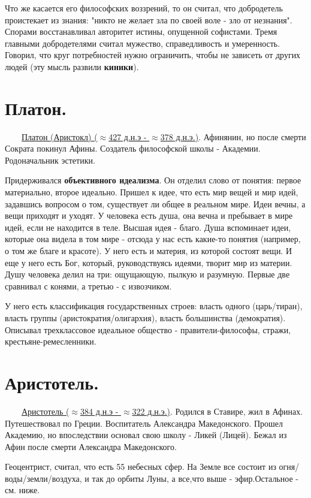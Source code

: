 \documentclass[12pt,a4paper]{article}
\begin{document}
Что же касается его философских воззрений, то он считал, что добродетель проистекает из знания: "никто не желает зла по своей воле - зло от незнания". Спорами восстанавливал авторитет истины, опущенной софистами. 
Тремя главными добродетелями считал мужество, справедливость и умеренность. Говорил, что круг потребностей нужно ограничить, чтобы не зависеть от других людей (эту мысль развили \textbf{киники}).

\section{Платон.}
\ \ \ \
\underline{Платон (Аристокл) ($\approx$427 д.н.э - $\approx$378 д.н.э.)}. Афинянин, но после смерти Сократа покинул Афины. Создатель философской школы - Академии. Родоначальник эстетики.

Придерживался \textbf{объективного идеализма}. Он отделил слово от понятия: первое материально, второе идеально. Пришел к идее, что есть мир вещей и мир идей, задавшись вопросом о том, существует ли общее в реальном мире. Идеи вечны, а вещи приходят и уходят. У человека есть душа, она вечна и пребывает в мире идей, если не находится в теле. Высшая идея - благо. Душа вспоминает идеи, которые она видела в том мире - отсюда у нас есть какие-то понятия (например, о том же благе и красоте).
У него есть и материя, из которой состоят вещи. И еще у него есть Бог, который, руководствуясь идеями, творит мир из материи. Душу человека делил на три: ощущающую, пылкую и разумную. Первые две сравнивал с конями, а третью - с извозчиком.

У него есть классификация государственных строев: власть одного (царь/тиран), власть группы (аристократия/олигархия), власть большинства (демократия). Описывал трехклассовое идеальное общество - правители-философы, стражи, крестьяне-ремесленники.

\section{Аристотель.}
\ \ \ \
\underline{Аристотель ($\approx$384 д.н.э - $\approx$322 д.н.э.)}. Родился в Ставире, жил в Афинах. Путешествовал по Греции. Воспитатель Александра Македонского. Прошел Академию, но впоследствии основал свою школу - Ликей (Лицей). Бежал из Афин после смерти Александра Македонского.

Геоцентрист, считал, что есть 55 небесных сфер. На Земле все состоит из огня/воды/земли/воздуха, и так до орбиты Луны, а все,что выше - эфир.Остальное - см. ниже.
\end{document}
